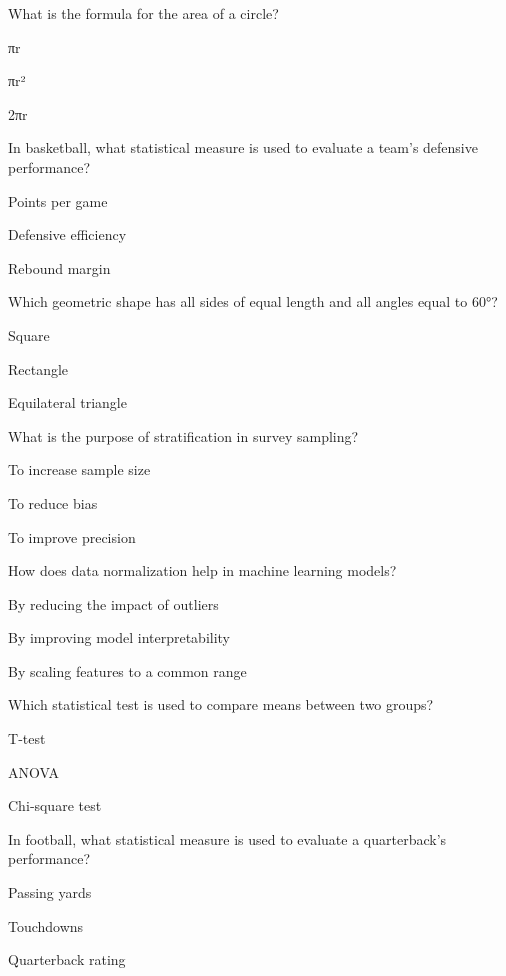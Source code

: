 \begin{enhancedmcq}{What is the formula for the area of a circle?}
\item πr
\item πr²
\item 2πr

\end{enhancedmcq}
\begin{enhancedmcq}{In basketball, what statistical measure is used to evaluate a team's defensive performance?}
\item Points per game
\item Defensive efficiency
\item Rebound margin

\end{enhancedmcq}
\begin{enhancedmcq}{Which geometric shape has all sides of equal length and all angles equal to 60°?}
\item Square
\item Rectangle
\item Equilateral triangle

\end{enhancedmcq}
\begin{enhancedmcq}{What is the purpose of stratification in survey sampling?}
\item To increase sample size
\item To reduce bias
\item To improve precision

\end{enhancedmcq}
\begin{enhancedmcq}{How does data normalization help in machine learning models?}
\item By reducing the impact of outliers
\item By improving model interpretability
\item By scaling features to a common range

\end{enhancedmcq}
\begin{enhancedmcq}{Which statistical test is used to compare means between two groups?}
\item T‑test
\item ANOVA
\item Chi‑square test

\end{enhancedmcq}
\begin{enhancedmcq}{In football, what statistical measure is used to evaluate a quarterback's performance?}
\item Passing yards
\item Touchdowns
\item Quarterback rating

\end{enhancedmcq}
